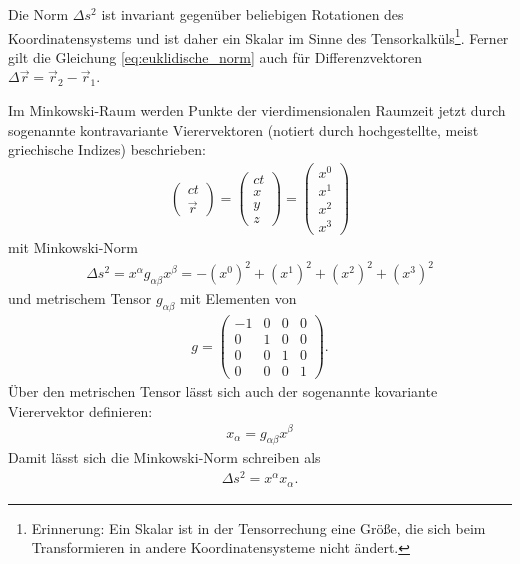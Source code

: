 Die Norm $\Delta s^2$ ist invariant gegenüber beliebigen Rotationen des Koordinatensystems und ist daher ein Skalar im Sinne des Tensorkalküls\footnote{Erinnerung: Ein Skalar ist in der Tensorrechung eine Größe, die sich beim Transformieren in andere Koordinatensysteme nicht ändert. }.
Ferner gilt die Gleichung \eqref{eq:euklidische_norm} auch für Differenzvektoren $\Delta\vec r=\vec r_2-\vec r_1$.

Im Minkowski-Raum werden Punkte der vierdimensionalen Raumzeit jetzt durch sogenannte kontravariante Vierervektoren (notiert durch hochgestellte, meist griechische Indizes) beschrieben:
\begin{align*}
    \begin{pmatrix} ct \\ \vec r \end{pmatrix} = \begin{pmatrix} ct \\ x \\ y \\ z \end{pmatrix}   = \begin{pmatrix} x^0 \\ x^1 \\ x^2 \\ x^3 \end{pmatrix}
\end{align*}
mit Minkowski-Norm
\begin{align*}
    \Delta s^2=x^\alpha g_{\alpha\beta}x^\beta=-(x^0)^2+(x^1)^2+(x^2)^2+(x^3)^2
\end{align*}
und metrischem Tensor $g_{\alpha\beta}$ mit Elementen von
\begin{align*}
    g = \begin{pmatrix}
            -1 & 0 & 0 & 0 \\
            0  & 1 & 0 & 0 \\
            0  & 0 & 1 & 0 \\
            0  & 0 & 0 & 1
        \end{pmatrix}.
\end{align*}
Über den metrischen Tensor lässt sich auch der sogenannte kovariante Vierervektor definieren:
\begin{align*}
    x_\alpha=g_{\alpha\beta}x^\beta
\end{align*}
Damit lässt sich die Minkowski-Norm schreiben als
\begin{align*}
    \Delta s^2=x^\alpha x_\alpha.
\end{align*}

